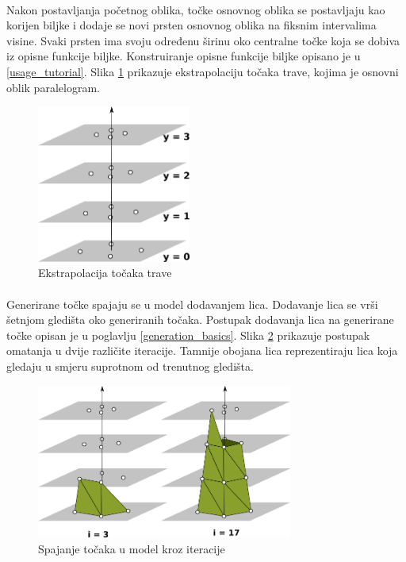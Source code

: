 \documentclass[times, utf8, diplomski]{fer}
\begin{document}
\paragraph{}
Nakon postavljanja početnog oblika, točke osnovnog oblika se postavljaju kao korijen biljke 
i dodaje se novi prsten osnovnog oblika na fiksnim intervalima visine. Svaki prsten ima 
svoju određenu širinu oko centralne točke koja se dobiva iz opisne funkcije biljke. Konstruiranje opisne funkcije biljke opisano je u \ref{usage_tutorial}. Slika \ref{fig:22-2} prikazuje ekstrapolaciju točaka trave, kojima je osnovni oblik paralelogram.

\begin{figure}[h]
	\centering
	\includegraphics[width=0.45\textwidth]{img/22-2}
	\caption{Ekstrapolacija točaka trave}
	\label{fig:22-2}
\end{figure}

\paragraph{}
Generirane točke spajaju se u model dodavanjem lica. Dodavanje lica se vrši šetnjom gledišta oko generiranih točaka. Postupak dodavanja lica na generirane točke opisan je u poglavlju \ref{generation_basics}. Slika \ref{fig:22-3} prikazuje postupak omatanja u dvije različite iteracije. Tamnije obojana lica reprezentiraju lica koja gledaju u smjeru suprotnom od trenutnog gledišta.

\begin{figure}[h]
	\centering
	\includegraphics[width=0.75\textwidth]{img/22-3}
	\caption{Spajanje točaka u model kroz iteracije}
	\label{fig:22-3}
\end{figure}
\end{document}
